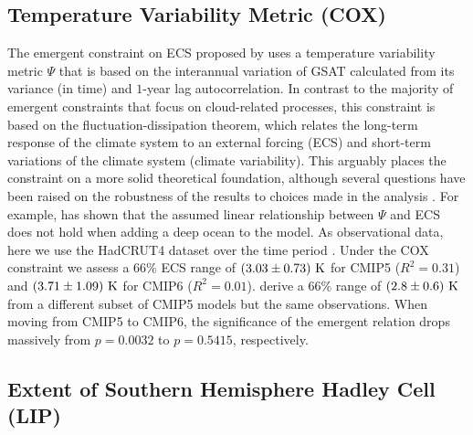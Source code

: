\subsection{Temperature Variability Metric (COX)}
\label{subsec:05:cox}

The emergent constraint on \ac{ECS} proposed by \textcite{Cox2018} uses a
temperature variability metric $\Psi$ that is based on the interannual
variation of \ac{GSAT} calculated from its variance (in time) and $1$-year lag
autocorrelation. In contrast to the majority of emergent constraints that focus
on cloud-related processes, this constraint is based on the
fluctuation-dissipation theorem, which relates the long-term response of the
climate system to an external forcing (\ac{ECS}) and short-term variations of
the climate system (climate variability). This arguably places the constraint
on a more solid theoretical foundation, although several questions have been
raised on the robustness of the results to choices made in the analysis
\autocite{Brown2018, PoChedley2018, Rypdal2018}. For example,
\textcite{Annan2020} has shown that the assumed linear relationship between
$\Psi$ and \ac{ECS} does not hold when adding a deep ocean to the model. As
observational data, here we use the HadCRUT4 dataset \autocite{Morice2012} over
the time period . Under the COX constraint we assess a $66
\unit{\%}$ \ac{ECS} range of $\pmrangeunit{3.03}{0.73}{K}$ for \acs{CMIP}5
($R^2 = 0.31$) and $\pmrangeunit{3.71}{1.09}{K}$ for \acs{CMIP}6 ($R^2 =
0.01$). \Textcite{Cox2018} derive a $66 \unit{\%}$ range of
$\pmrangeunit{2.8}{0.6}{K}$ from a different subset of \acs{CMIP}5 models but
the same observations. When moving from \acs{CMIP}5 to \acs{CMIP}6, the
significance of the emergent relation drops massively from $p = 0.0032$ to $p =
0.5415$, respectively.


\subsection{Extent of Southern Hemisphere Hadley Cell (LIP)}
\label{subsec:05:lip}

